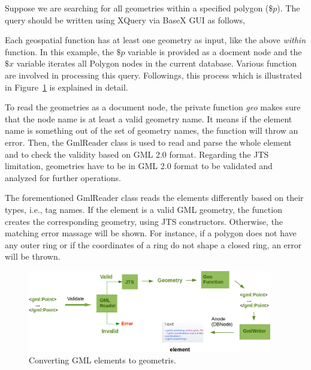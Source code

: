 \documentclass[a4paper,12pt]{article}
\begin{document}
Suppose we are searching for all geometries within a specified polygon ($\$p$). The query should be written using XQuery via BaseX GUI as follows,
\vspace{10px}
\vspace{10px}
Each geospatial function has at least one geometry as input, like the above \textit{within} function. In this example, the $\$p$ variable is provided as a docment node and the $\$x$ variable iterates all Polygon nodes in the current database. Various function are involved in processing this query. Followings, this process which is illustrated in Figure~\ref{figGeoModuleProcess} is explained in detail. 

To read the geometries as a document node, the private function \textit{geo} makes sure that the node name is at least a valid geometry name. It means if the element name is something out of the set of geometry names, the function will throw an error. 
Then, the GmlReader class is used to read and parse the whole element and to check the validity based on GML 2.0 format. Regarding the JTS limitation, geometries have to be in GML 2.0 format to be validated and analyzed for further operations. 

The forementioned GmlReader class reads the elements differently based on their types, i.e., tag names. If the element is a valid GML geometry, the function creates the corresponding geometry, using JTS constructors. Otherwise, the matching error massage will be shown. For instance, if a polygon does not have any outer ring or if the coordinates of a ring do not shape a closed ring, an error will be thrown. 

 \begin{figure}
\centering
\includegraphics[width=0.95\textwidth]{GeoModuleProcess}
\caption{Converting GML elements to geometris.}
\label{figGeoModuleProcess}
\end{figure}
\end{document}

